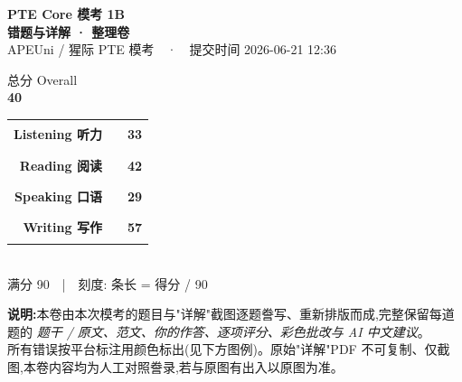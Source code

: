 
\begin{titlepage}
\thispagestyle{empty}
\centering
\vspace*{1.4cm}

{\fontsize{30}{36}\selectfont\bfseries\color{cHead} PTE Core 模考 1B}\\[4mm]
{\fontsize{17}{20}\selectfont\color{cAccent}\bfseries 错题与详解 · 整理卷}\\[3mm]
{\color{gray} APEUni / 猩际 PTE 模考　·　提交时间 2026-06-21 12:36}\\[1.2cm]

\begin{tcolorbox}[width=0.62\textwidth, halign=center, enhanced,
  colback=cAccent, colframe=cAccent, arc=6pt, boxrule=0pt, top=10pt, bottom=10pt]
  {\color{white}\large 总分 Overall}\\[2pt]
  {\fontsize{46}{50}\selectfont\bfseries\color{white} 40}
\end{tcolorbox}

\vspace{1.0cm}

\begin{tcolorbox}[width=0.84\textwidth, enhanced, colback=white, colframe=cRule,
  boxrule=0.8pt, arc=4pt, left=18pt, right=18pt, top=14pt, bottom=14pt]
\setlength{\tabcolsep}{6pt}\renewcommand{\arraystretch}{1.7}
\sffamily
\begin{tabular}{@{}r@{\hskip 8pt}l@{\hskip 10pt}l@{}}
 \bfseries Listening 听力 & {\color{mListen}\rule{3.67cm}{0.42cm}} & {\bfseries\large 33}\\
 \bfseries Reading 阅读   & {\color{mRead}\rule{4.67cm}{0.42cm}}   & {\bfseries\large 42}\\
 \bfseries Speaking 口语  & {\color{mSpeak}\rule{3.22cm}{0.42cm}}  & {\bfseries\large 29}\\
 \bfseries Writing 写作   & {\color{mWrite}\rule{6.33cm}{0.42cm}}  & {\bfseries\large 57}\\
\end{tabular}\\[2mm]
{\footnotesize\color{gray} 满分 90　|　刻度: 条长 = 得分 / 90}
\end{tcolorbox}

\vfill
\begin{flushleft}\small\color{gray}
\textbf{说明:}本卷由本次模考的题目与"详解"截图逐题誊写、重新排版而成,完整保留每道题的
\emph{题干 / 原文、范文、你的作答、逐项评分、彩色批改与 AI 中文建议}。\\
所有错误按平台标注用颜色标出(见下方图例)。原始"详解"PDF 不可复制、仅截图,本卷内容均为人工对照誊录,若与原图有出入以原图为准。
\end{flushleft}
\vspace{4mm}
\ptelegend
\end{titlepage}
